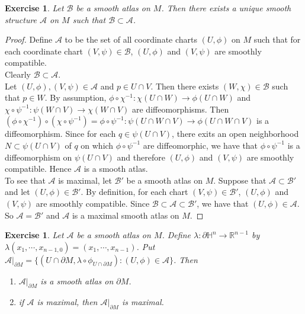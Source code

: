 \documentclass[12pt]{amsart}
\newtheorem{ex}[thm]{Exercise}
\newcommand{\lam}{\lambda}
\renewcommand{\H}{\mathbb{H}}
\newcommand{\R}{\mathbb{R}}
\newcommand{\MA}{\mathcal{A}}
\newcommand{\MB}{\mathcal{B}}
\begin{document}
	\begin{ex}
		Let $\MB$ be a smooth atlas on $M$. Then there exists a unique smooth structure $\MA$ on $M$ such that $\MB \subset \MA$.
	\end{ex}

	\begin{proof}
		Define $\MA$ to be the set of all coordinate charts $(U, \phi)$ on $M$ such that for each coordinate chart $(V, \psi) \in \MB$,  $(U, \phi)$ and $(V, \psi) $ are smoothly compatible. \\
		Clearly $\MB \subset \MA$. \\
		Let $(U, \phi), (V, \psi) \in \MA$ and $p \in U \cap V$. Then there exists $(W, \chi) \in \MB$ such that $p \in W$. By assumption, $\phi \circ \chi^{-1} : \chi(U \cap W) \rightarrow \phi(U \cap W)$ and $ \chi \circ \psi^{-1} : \psi(W \cap V) \rightarrow \chi(W \cap V)$ are diffeomorphisms. Then $ (\phi \circ \chi^{-1}) \circ (\chi \circ \psi^{-1}) = \phi \circ \psi^{-1}: \psi(U \cap W \cap V) \rightarrow  \phi(U \cap W \cap V) $ is a diffeomorphism.  Since for each $q \in \psi(U \cap V)$, there exits an open neighborhood $N \subset \psi(U \cap V)$ of $q$ on which $\phi \circ \psi^{-1}$ are diffeomorphic, we have that $\phi \circ \psi^{-1}$ is a diffeomorphism on $\psi(U \cap V)$ and therefore $(U, \phi)$ and $ (V, \psi)$ are smoothly compatible. Hence $\MA$ is a smooth atlas.\\
		To see that $\MA$ is maximal, let $\MB'$ be a smooth atlas on $M$. Suppose that $\MA \subset \MB'$ and let $(U, \phi) \in \MB'$. By definition, for each chart $(V, \psi) \in \MB'$, $(U, \phi)$ and $(V, \psi)$ are smoothly compatible. Since $\MB \subset \MA \subset \MB'$, we have that $(U, \phi) \in \MA$. So $\MA = \MB'$ and $\MA$ is a maximal smooth atlas on $M$.
	\end{proof}

	\begin{ex}
		Let $\MA$ be a smooth atlas on $M$. Define $\lam: \partial \H^n \rightarrow \R^{n-1}$ by $\lam(x_1, \cdots, x_{n-1, 0}) = (x_1, \cdots, x_{n-1})$. Put $\MA|_{\partial M} = \{(U \cap \partial M, \lam \circ \phi_{U \cap \partial M}): (U, \phi) \in \MA\}$. Then 
		\begin{enumerate}
			\item $\MA|_{\partial M}$ is a smooth atlas on $\partial M$.
			\item if $ \MA $ is maximal, then $\MA|_{\partial M}$ is maximal.
		\end{enumerate}
	\end{ex}
\end{document}
